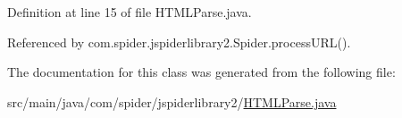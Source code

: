 \-Definition at line 15 of file \-H\-T\-M\-L\-Parse.\-java.



\-Referenced by com.\-spider.\-jspiderlibrary2.\-Spider.\-process\-U\-R\-L().



\-The documentation for this class was generated from the following file\-:\begin{DoxyCompactItemize}
\item 
src/main/java/com/spider/jspiderlibrary2/\hyperlink{_h_t_m_l_parse_8java}{\-H\-T\-M\-L\-Parse.\-java}\end{DoxyCompactItemize}
